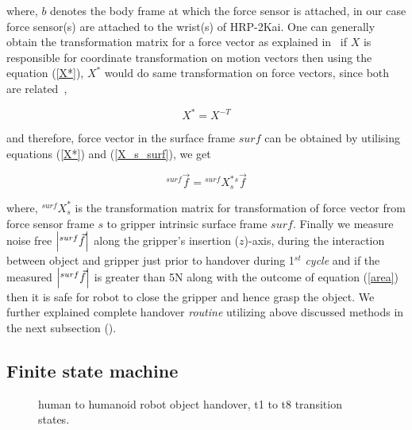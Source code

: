 where, $b$ denotes the body frame at which the force sensor is attached, in our case force sensor(s) are attached to the wrist(s) of HRP-2Kai. One can generally obtain the transformation matrix for a force vector as explained in~\cite{featherstone2014rigid} if $X$ is responsible for coordinate transformation on motion vectors then using the equation (\ref{X*}), $X^{*}$ would do same transformation on force vectors, since both are related~\cite{featherstone2014rigid},

\begin{equation}\label{X*}
    X^{*} = X^{-T}
\end{equation}

and therefore, force vector in the surface frame $surf$ can be obtained by utilising equations (\ref{X*}) and (\ref{X_s_surf}), we get

\begin{equation}\label{force surf}
    {}^{surf}\vec{f} = {}^{surf}X_{s}^{*} {}^s\vec{f}
\end{equation}

where, ${}^{surf}X_{s}^{*}$ is the transformation matrix for transformation of force vector from force sensor frame $s$ to gripper intrinsic surface frame $surf$. Finally we measure noise free $\abs{{}^{surf}\vec{f}}$ along the gripper's insertion ($z$)-axis, during the interaction between object and gripper just prior to handover during 1$^{st}$ \textit{cycle} and if the measured $\abs{{}^{surf}\vec{f}}$ is greater than 5N along with the outcome of equation (\ref{area}) then it is safe for robot to close the gripper and hence grasp the object. We further explained complete handover \textit{routine} utilizing above discussed methods in the next subsection ().

\subsection{Finite state machine}\label{FSM}

\begin{figure}[hpt]
	\caption{human to humanoid robot object handover, t1 to t8 transition states.}
	\label{fig:h-to-r}
\end{figure}

